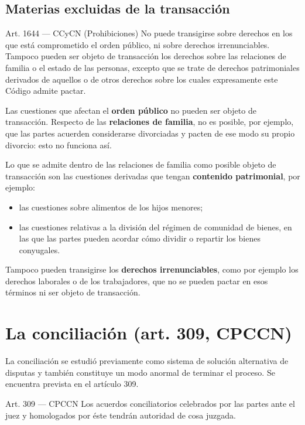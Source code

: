 \documentclass[12pt,oneside]{book}
\begin{document}
\subsection{Materias excluidas de la transacción}

\begin{articulo}{Art. 1644 --- CCyCN (Prohibiciones)}
No puede transigirse sobre derechos en los que está comprometido el orden público, ni sobre derechos irrenunciables. Tampoco pueden ser objeto de transacción los derechos sobre las relaciones de familia o el estado de las personas, excepto que se trate de derechos patrimoniales derivados de aquellos o de otros derechos sobre los cuales expresamente este Código admite pactar.
\end{articulo}

Las cuestiones que afectan el \textbf{orden público} no pueden ser objeto de transacción. Respecto de las \textbf{relaciones de familia}, no es posible, por ejemplo, que las partes acuerden considerarse divorciadas y pacten de ese modo su propio divorcio: esto no funciona así.

Lo que se admite dentro de las relaciones de familia como posible objeto de transacción son las cuestiones derivadas que tengan \textbf{contenido patrimonial}, por ejemplo:

\begin{itemize}
    \item las cuestiones sobre alimentos de los hijos menores;
    \item las cuestiones relativas a la división del régimen de comunidad de bienes, en las que las partes pueden acordar cómo dividir o repartir los bienes conyugales.
\end{itemize}

Tampoco pueden transigirse los \textbf{derechos irrenunciables}, como por ejemplo los derechos laborales o de los trabajadores, que no se pueden pactar en esos términos ni ser objeto de transacción.

\section{La conciliación (art. 309, CPCCN)}

La conciliación se estudió previamente como sistema de solución alternativa de disputas y también constituye un modo anormal de terminar el proceso. Se encuentra prevista en el artículo 309.

\begin{articulo}{Art. 309 --- CPCCN}
Los acuerdos conciliatorios celebrados por las partes ante el juez y homologados por éste tendrán autoridad de cosa juzgada.
\end{articulo}
\end{document}
